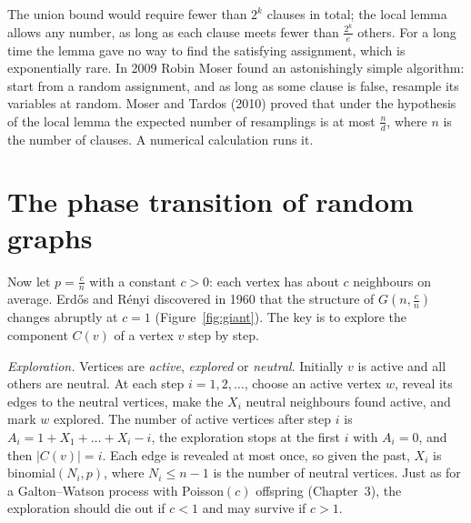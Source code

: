 The union bound would require fewer than $2^k$ clauses in total; the local lemma allows any number, as long as each clause
meets fewer than $\frac{2^k}e$ others. For a long time the lemma gave no way to find the satisfying assignment, which is exponentially rare.
In 2009 Robin Moser found an astonishingly simple algorithm: start from a random assignment, and as long as some clause
is false, resample its variables at random. Moser and Tardos (2010) proved that under the hypothesis of the local
lemma the expected number of resamplings is at most $\frac n d$, where $n$ is the number of clauses. A numerical calculation runs it.

\section{The phase transition of random graphs}

Now let $p=\frac cn$ with a constant $c>0$: each vertex has about $c$ neighbours on average. Erd\H os and R\'enyi discovered in 1960 that
the structure of $G(n,\frac cn)$ changes abruptly at $c=1$ (Figure~\ref{fig:giant}). The key is to explore the component $C(v)$ of a vertex $v$ step by step.

\emph{Exploration.} Vertices are \emph{active}, \emph{explored} or \emph{neutral}. Initially $v$ is active and all others are neutral. At each step $i=1,2,\ldots$,
choose an active vertex $w$, reveal its edges to the neutral vertices, make the $X_i$ neutral neighbours found active, and mark
$w$ explored. The number of active vertices after step $i$ is $A_i=1+X_1+\dots+X_i-i$, the exploration stops at the first $i$ with $A_i=0$, and then $|C(v)|=i$.
Each edge is revealed at most once, so given the past, $X_i$ is binomial$(N_i,p)$, where $N_i\le n-1$ is the number of neutral vertices. Just as for a
Galton--Watson process with Poisson$(c)$ offspring (Chapter~3), the exploration should die out if $c<1$ and may survive if $c>1$.

